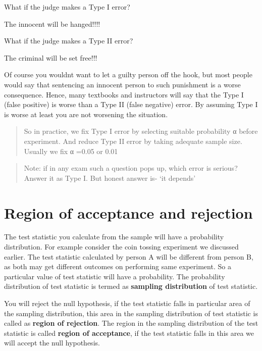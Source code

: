 \documentclass[
]{book}
\begin{document}
What if the judge makes a Type I error?

The innocent will be hanged!!!!

What if the judge makes a Type II error?

The criminal will be set free!!!

Of course you wouldn\textquotesingle t want to let a guilty person off the hook, but most people would say that sentencing an innocent person to such punishment is a worse consequence. Hence, many textbooks and instructors will say that the Type I (false positive) is worse than a Type II (false
negative) error. By assuming Type I is worse at least you are not worsening the situation.

\begin{quote}
So in practice, we fix Type I error by selecting suitable probability α before experiment. And reduce Type II error by taking adequate sample size. Usually we fix α =0.05 or 0.01
\end{quote}

\begin{quote}
Note: if in any exam such a question pops up, which error is serious? Answer it as Type I. But honest answer is- `it depends'
\end{quote}

\hypertarget{region-of-acceptance-and-rejection}{%
\section{Region of acceptance and rejection}\label{region-of-acceptance-and-rejection}}

The test statistic you calculate from the sample will have a probability distribution. For example consider the coin tossing experiment we discussed earlier. The test statistic calculated by person A will be different from person B, as both may get different outcomes on performing same experiment. So a particular value of test statistic will
have a probability. The probability distribution of test statistic is termed as \textbf{sampling distribution} of test statistic.

You will reject the null hypothesis, if the test statistic falls in particular area of the sampling distribution, this area in the sampling distribution of test statistic is called as \textbf{region of rejection}. The region in the sampling distribution of the test statistic is called
\textbf{region of acceptance}, if the test statistic falls in this area we will accept the null hypothesis.
\end{document}
